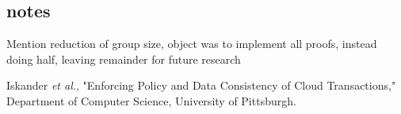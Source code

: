 \documentclass[11pt]{article}
\begin{document}
\subsection{notes}
Mention reduction of group size, object was to implement all proofs, instead doing half, leaving remainder for future research
\begin{thebibliography}{9}
 Iskander \emph{et al.}, "Enforcing Policy and Data Consistency of Cloud Transactions," Department of Computer Science, University of Pittsburgh.
\end{thebibliography}
\end{document}
